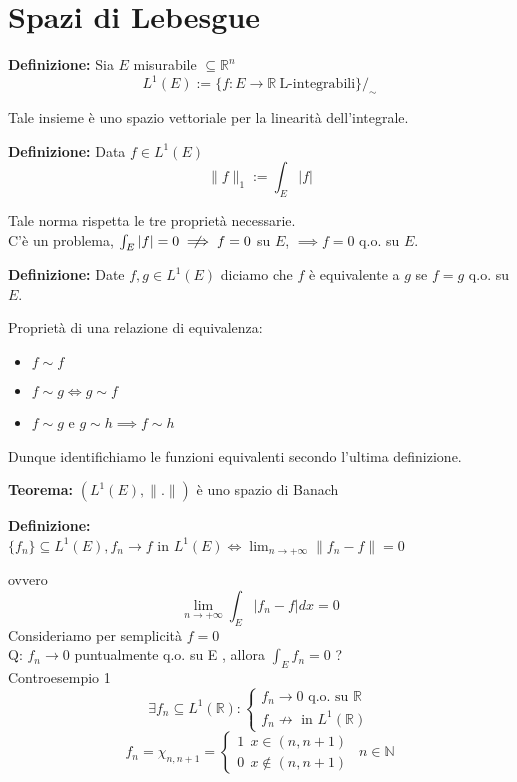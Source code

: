 \documentclass[a4paper]{article}
\newcommand{\R}{\mathbb{R}}
\newcommand{\C}{\mathbb{C}}
\newcommand{\N}{\mathbb{N}}
\begin{document}
\section{Spazi di Lebesgue}
\begin{tcolorbox}
	\textbf{Definizione: }Sia  $E$  misurabile  $\subseteq\R^n$ 
	  \[L^1(E):= \{f:E\to  \R\     \text{L-integrabili} \} /_{\sim}\]  
\end{tcolorbox}
Tale insieme è uno spazio vettoriale per la linearità dell'integrale.
\begin{tcolorbox}
	\textbf{Definizione: }Data  $f \in  L ^1(E)$ 
  \[\|f\|_1:=\int_{E}^{} |f|\]  
\end{tcolorbox}
Tale norma rispetta le tre proprietà necessarie.
\\C'è un problema,  $\int_{E}^{} |f|=0\centernot\implies f=0$  su $E$,  $\implies f=0$  q.o. su  $E$.
\begin{tcolorbox}
	\textbf{Definizione: }Date  $f,g\in  L ^1(E)$  diciamo che  $f$  è equivalente a  $g$  se  $f=g$  q.o. su  $E$.
\end{tcolorbox}
Proprietà di una relazione di equivalenza:
\begin{itemize}
	\item $f\sim f$ 
	\item $f\sim g \iff g\sim f$ 
	\item $ f\sim g$ e $g\sim h\implies f\sim h$ 
\end{itemize}
Dunque identifichiamo le funzioni equivalenti secondo l'ultima definizione.
\begin{tcolorbox}
	\textbf{Teorema: }$(L^1(E),\|.\|)$  è uno spazio di Banach
\end{tcolorbox}
\begin{tcolorbox}
	\textbf{Definizione: }\\$\{f_n\} \subseteq L^1(E),f_n\to f$ in $L^1(E) \iff \lim_{n \to +\infty} \|f_n-f\|=0$ 
\end{tcolorbox}
ovvero
\[\lim_{n\to +\infty} \int_{E}^{} |f_n-f|dx=0\] 
Consideriamo per semplicità  $f=0$ 
\\Q: $f_n\to  0$  puntualmente q.o. su  E , allora  $\int_{E}^{} f_n=0$ ? 
\\Controesempio 1
\[\exists f_n\subseteq  L^1(\R): \begin{cases}
	f_n\to 0\text{ q.o. su } \R\\
	f_n \not\to \text{ in }L^1(\R)
\end{cases}
\]
\[f_n=\chi_{n, n+1}=\begin{cases}
	1\ \ x\in(n,n+1)
	\\0\ \ x \not\in (n,n+1)
\end{cases}\ \ n\in \N
\]
\end{document}
